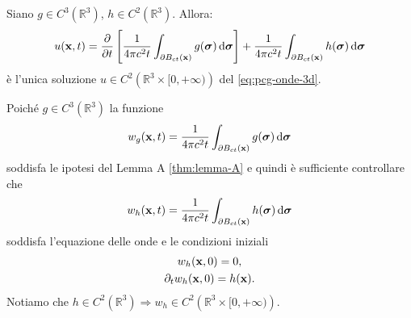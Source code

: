 \begin{theorem}
     Siano $\displaystyle g\in C^{3}\left(\mathbb{R}^{3}\right)$, $\displaystyle h\in C^{2}\left(\mathbb{R}^{3}\right)$. Allora:
    \begin{equation}
        u(\mathbf{x} ,t) =\frac{\partial }{\partial t}\left[\frac{1}{4\pi c^{2} t}\int _{\partial B_{ct}(\mathbf{x})} g(\bm{\sigma}) \,\mathrm d \bm{\sigma}\right] +\frac{1}{4\pi c^{2} t}\int _{\partial B_{ct}(\mathbf{x})} h(\bm{\sigma}) \,\mathrm d \bm{\sigma}
    \end{equation}
    è l'unica soluzione $\displaystyle u\in C^{2}\left(\mathbb{R}^{3} \times [ 0,+\infty)\right)$ del \eqref{eq:pcg-onde-3d}.
\end{theorem}
\begin{dimostrazione}
    Poiché $\displaystyle g\in C^{3}\left(\mathbb{R}^{3}\right)$ la funzione
    \begin{equation*}
        w_{g}(\mathbf{x} ,t) =\frac{1}{4\pi c^{2} t}\int _{\partial B_{ct}(\mathbf{x})} g(\bm{\sigma}) \,\mathrm d \bm{\sigma}
    \end{equation*}
    soddisfa le ipotesi del Lemma A \vref{thm:lemma-A} e quindi è sufficiente controllare che
    \begin{equation*}
        w_{h}(\mathbf{x} ,t) =\frac{1}{4\pi c^{2} t}\int _{\partial B_{ct}(\mathbf{x})} h(\bm{\sigma}) \,\mathrm d \bm{\sigma}
    \end{equation*}
    soddisfa l'equazione delle onde e le condizioni iniziali
    \begin{gather*}
        w_{h}(\mathbf{x} ,0) =0,\\
        \partial _{t} w_{h}(\mathbf{x} ,0) =h(\mathbf{x}) .
    \end{gather*}
    Notiamo che $\displaystyle h\in C^{2}\left(\mathbb{R}^{3}\right) \Rightarrow w_{h} \in C^{2}\left(\mathbb{R}^{3} \times [ 0,+\infty)\right)$.


\end{dimostrazione}
